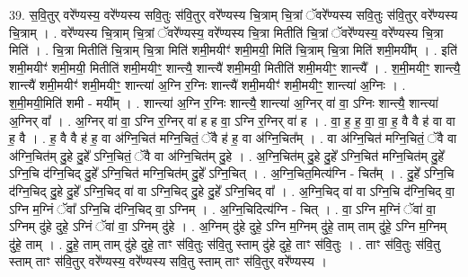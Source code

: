 \documentclass[17pt]{extarticle}
\begin{document}
39. स॒वि॒तुर् वरे᳚ण्यस्य॒ वरे᳚ण्यस्य सवि॒तुः स॑वि॒तुर् वरे᳚ण्यस्य चि॒त्राम् चि॒त्रां ॅवरे᳚ण्यस्य सवि॒तुः स॑वि॒तुर् वरे᳚ण्यस्य चि॒त्राम् । . वरे᳚ण्यस्य चि॒त्राम् चि॒त्रां ॅवरे᳚ण्यस्य॒ वरे᳚ण्यस्य चि॒त्रा मितीति॑ चि॒त्रां ॅवरे᳚ण्यस्य॒ वरे᳚ण्यस्य चि॒त्रा मिति॑ । . चि॒त्रा मितीति॑ चि॒त्राम् चि॒त्रा मिति॑ शमी॒मयीꣳ॑ शमी॒मयी॒ मिति॑ चि॒त्राम् चि॒त्रा मिति॑ शमी॒मयी᳚म् । . इति॑ शमी॒मयीꣳ॑ शमी॒मयी॒ मितीति॑ शमी॒मयीꣳ॒॒ शान्त्यै॒ शान्त्यै॑ शमी॒मयी॒ मितीति॑ शमी॒मयीꣳ॒॒ शान्त्यै᳚ । . श॒मी॒मयीꣳ॒॒ शान्त्यै॒ शान्त्यै॑ शमी॒मयीꣳ॑ शमी॒मयीꣳ॒॒ शान्त्या॑ अ॒ग्नि र॒ग्निः शान्त्यै॑ शमी॒मयीꣳ॑ शमी॒मयीꣳ॒॒ शान्त्या॑ अ॒ग्निः । . श॒मी॒मयी॒मिति॑ शमी - मयी᳚म् । . शान्त्या॑ अ॒ग्नि र॒ग्निः शान्त्यै॒ शान्त्या॑ अ॒ग्निर् वा॑ वा॒ ऽग्निः शान्त्यै॒ शान्त्या॑ अ॒ग्निर् वा᳚ । . अ॒ग्निर् वा॑ वा॒ ऽग्नि र॒ग्निर् वा॑ ह ह वा॒ ऽग्नि र॒ग्निर् वा॑ ह । . वा॒ ह॒ ह॒ वा॒ वा॒ ह॒ वै वै ह॑ वा वा ह॒ वै । . ह॒ वै वै ह॑ ह॒ वा अ॑ग्नि॒चित॑ मग्नि॒चितं॒ ॅवै ह॑ ह॒ वा अ॑ग्नि॒चित᳚म् । . वा अ॑ग्नि॒चित॑ मग्नि॒चितं॒ ॅवै वा अ॑ग्नि॒चित॑म् दु॒हे दु॒हे᳚ ऽग्नि॒चितं॒ ॅवै वा अ॑ग्नि॒चित॑म् दु॒हे । . अ॒ग्नि॒चित॑म् दु॒हे दु॒हे᳚ ऽग्नि॒चित॑ मग्नि॒चित॑म् दु॒हे᳚ ऽग्नि॒चि द॑ग्नि॒चिद् दु॒हे᳚ ऽग्नि॒चित॑ मग्नि॒चित॑म् दु॒हे᳚ ऽग्नि॒चित् । . अ॒ग्नि॒चित॒मित्य॑ग्नि - चित᳚म् । . दु॒हे᳚ ऽग्नि॒चि द॑ग्नि॒चिद् दु॒हे दु॒हे᳚ ऽग्नि॒चिद् वा॑ वा ऽग्नि॒चिद् दु॒हे दु॒हे᳚ ऽग्नि॒चिद् वा᳚ । . अ॒ग्नि॒चिद् वा॑ वा ऽग्नि॒चि द॑ग्नि॒चिद् वा॒ ऽग्नि म॒ग्निं ॅवा᳚ ऽग्नि॒चि द॑ग्नि॒चिद् वा॒ ऽग्निम् । . अ॒ग्नि॒चिदित्य॑ग्नि - चित् । . वा॒ ऽग्नि म॒ग्निं ॅवा॑ वा॒ ऽग्निम् दु॑हे दुहे॒ ऽग्निं ॅवा॑ वा॒ ऽग्निम् दु॑हे । . अ॒ग्निम् दु॑हे दुहे॒ ऽग्नि म॒ग्निम् दु॑हे॒ ताम् ताम् दु॑हे॒ ऽग्नि म॒ग्निम् दु॑हे॒ ताम् । . दु॒हे॒ ताम् ताम् दु॑हे दुहे॒ ताꣳ स॑वि॒तुः स॑वि॒तु स्ताम् दु॑हे दुहे॒ ताꣳ स॑वि॒तुः । . ताꣳ स॑वि॒तुः स॑वि॒तु स्ताम् ताꣳ स॑वि॒तुर् वरे᳚ण्यस्य॒ वरे᳚ण्यस्य सवि॒तु स्ताम् ताꣳ स॑वि॒तुर् वरे᳚ण्यस्य । \newline
\pagebreak
{}
\end{document}
